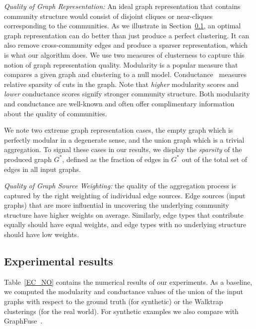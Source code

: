 \documentclass{IEEEtran}
\begin{document}
{\em Quality of Graph Representation:} An ideal graph representation that
contains community structure would consist of disjoint cliques or near-cliques
corresponding to the communities. As we illustrate in
Section~\ref{sec:results}, an optimal graph representation can do better than
just produce a perfect clustering. It can also remove cross-community edges and
produce a sparser representation, which is what our algorithm does. We use two
measures of clusterness to capture this notion of graph representation quality.
Modularity \cite{Newman06} is a popular measure that compares a given graph and
clustering to a null model. Conductance~\cite{Leskovec2008,Gleich2012} measures
relative sparsity of cuts in the graph. 
Note that \emph{higher} modularity scores and \emph{lower} conductance scores
signify stronger community structure. Both modularity and conductance are
well-known and often offer complimentary information about the quality of
communities.
 
We note two extreme graph representation cases, the empty graph which is
perfectly modular in a degenerate sense, and the union graph which is a trivial
aggregation. To signal these cases in our results, we display the
\emph{sparsity} of the produced graph $G^*$, defined as the fraction of edges
in $G^*$ out of the total set of edges in all input graphs. 

{\em Quality of Graph Source Weighting:} the quality of the aggregation process
is captured by the right weighting of individual edge sources. Edge sources (input
graphs) that are more influential in uncovering the underlying community
structure have higher weights on average. Similarly, edge types that contribute
equally should have equal weights, and edge types with no underlying structure
should have low weights.


\subsection{Experimental results}
\label{sec:results}

Table~\ref{EC_NO} contains the numerical results of our experiments. As a
baseline, we computed the modularity and conductance values of the union of the
input graphs with respect to the ground truth (for synthetic) or the Walktrap
clusterings (for the real world). For synthetic examples we also compare with
GraphFuse~\cite{Papalexakis2013}. 
\end{document}
